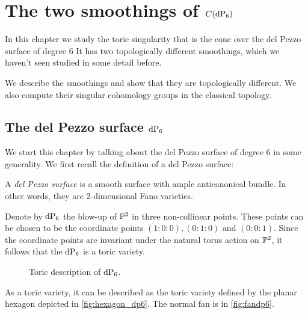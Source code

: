\chapter{The two smoothings of \texorpdfstring{$C(\dP6)$}{C(dP6)}}
\label{chap:smoothings}

In this chapter we study the toric singularity that is the cone over the del Pezzo surface of degree $6$ It has two topologically different smoothings, which we haven't seen studied in some detail before.

We describe the smoothings and show that they are topologically different. We also compute their singular cohomology groups in the classical topology.

\section{The del Pezzo surface \texorpdfstring{$\dP6$}{dP6}}
\label{sec:twosmoothings}

We start this chapter by talking about the del Pezzo surface of degree $6$ in some generality. We first recall the definition of a del Pezzo surface:

\begin{definition}
A \emph{del Pezzo surface} is a smooth surface with ample anticanonical bundle. In other words, they are 2-dimensional Fano varieties.
\end{definition}

Denote by $\dP6$ the blow-up of $\P^2$ in three non-collinear points.  These points can be chosen to be the coordinate points $(1:0:0),(0:1:0)$ and $(0:0:1)$. Since the coordinate points are invariant under the natural torus action on $\P^2$, it follows that the $\dP6$ is a toric variety.

\begin{figure}[b]
\centering 
\hspace*{\fill}
\hspace*{\fill}
\hspace*{\fill}
\caption{Toric description of $\dP6$.}
\end{figure}

As a toric variety, it can be described as the toric variety defined by the planar hexagon depicted in \cref{fig:hexagon_dp6}. The normal fan is in \cref{fig:fandp6}.


